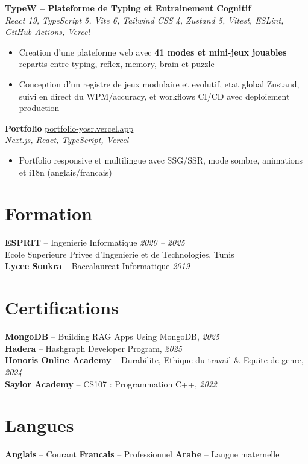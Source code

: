 \documentclass[10pt,a4paper]{article}
\begin{document}
{\vspace{3pt}
\textbf{TypeW -- Plateforme de Typing et Entrainement Cognitif} \\[1pt]
\textit{React 19, TypeScript 5, Vite 6, Tailwind CSS 4, Zustand 5, Vitest, ESLint, GitHub Actions, Vercel}
\begin{itemize}
  \item Creation d'une plateforme web avec \textbf{41 modes et mini-jeux jouables} repartis entre typing, reflex, memory, brain et puzzle
  \item Conception d'un registre de jeux modulaire et evolutif, etat global Zustand, suivi en direct du WPM/accuracy, et workflows CI/CD avec deploiement production
\end{itemize}

\vspace{3pt}
\textbf{Portfolio} \hfill \href{https://portfolio-yosr.vercel.app/en}{portfolio-yosr.vercel.app}\\[1pt]
\textit{Next.js, React, TypeScript, Vercel}
\begin{itemize}
  \item Portfolio responsive et multilingue avec SSG/SSR, mode sombre, animations et i18n (anglais/francais)
\end{itemize}

}

\section*{Formation}
{\small
\textbf{ESPRIT} -- Ingenierie Informatique \hfill \textit{2020 -- 2025}\\[1pt]
Ecole Superieure Privee d'Ingenierie et de Technologies, Tunis\\[3pt]
\textbf{Lycee Soukra} -- Baccalaureat Informatique \hfill \textit{2019}
}

\section*{Certifications}
{\small
\textbf{MongoDB} -- Building RAG Apps Using MongoDB, \textit{2025}\\[1pt]
\textbf{Hadera} -- Hashgraph Developer Program, \textit{2025}\\[1pt]
\textbf{Honoris Online Academy} -- Durabilite, Ethique du travail \& Equite de genre, \textit{2024}\\[1pt]
\textbf{Saylor Academy} -- CS107 : Programmation C++, \textit{2022}
}

\section*{Langues}
{\small
\textbf{Anglais} -- Courant \quad\textbar\quad \textbf{Francais} -- Professionnel \quad\textbar\quad \textbf{Arabe} -- Langue maternelle
}
\end{document}

